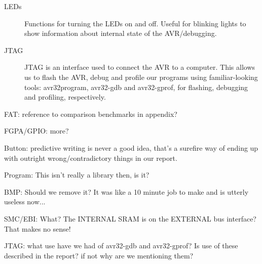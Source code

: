 \begin{description}
\item[LEDs] Functions for turning the \acp{LED} on and off. Useful for blinking
  lights to show information about internal state of the AVR/debugging.
  
\item[JTAG] \ac{JTAG} is an interface used to connect the AVR to a
  computer. This allows us to flash the AVR, debug and profile our programs
  using familiar-looking tools: avr32program, avr32-gdb and avr32-gprof, for
  flashing, debugging and profiling, respectively.
\end{description}

{\color{red}

FAT: reference to comparison benchmarks in appendix?

FGPA/GPIO: more?

Button: predictive writing is never a good idea, that's a surefire way of ending
up with outright wrong/contradictory things in our report.

Program: This isn't really a library then, is it?

BMP: Should we remove it? It was like a 10 minute job to make and is utterly
useless now...

SMC/EBI: What? The INTERNAL SRAM is on the EXTERNAL bus interface? That makes no
sense!

JTAG: what use have we had of avr32-gdb and avr32-gprof? Is use of these
described in the report? if not why are we mentioning them?
}
